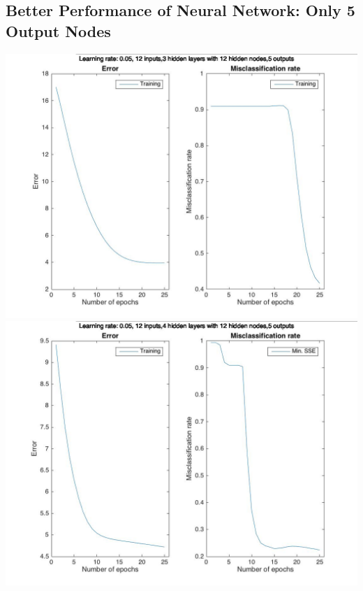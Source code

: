 \documentclass[12pt]{article}
\begin{document}
\subsection{Better Performance of Neural Network: Only 5 Output Nodes}
\label{subsec:annBetterPerformance}
\includegraphics[scale=0.45]{images/ann/slightlyBetterWithTop5Genres1}
\includegraphics[scale=0.45]{images/ann/slightlyBetterWithTop5Genres2}
\end{document}
